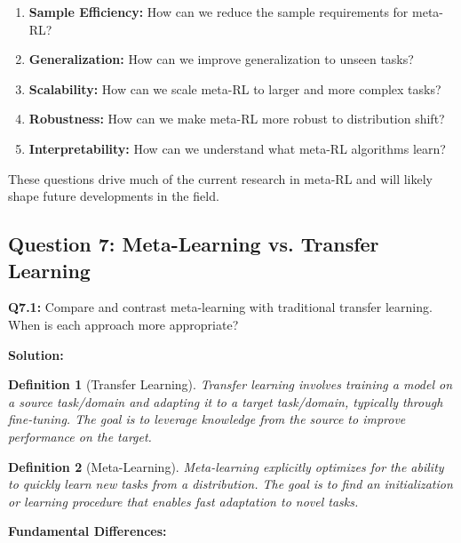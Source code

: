 \documentclass[12pt]{article}
\newcommand{\ieee}[1]{\textcolor{IEEEBlue}{\textbf{#1}}}
\newtheorem{definition}{Definition}
\begin{document}
{{			\begin{enumerate}
				\item \textbf{Sample Efficiency:} How can we reduce the sample requirements for meta-RL?
				\item \textbf{Generalization:} How can we improve generalization to unseen tasks?
				\item \textbf{Scalability:} How can we scale meta-RL to larger and more complex tasks?
				\item \textbf{Robustness:} How can we make meta-RL more robust to distribution shift?
				\item \textbf{Interpretability:} How can we understand what meta-RL algorithms learn?
			\end{enumerate}
			
			These questions drive much of the current research in meta-RL and will likely shape future developments in the field.
			
			\subsection{Question 7: Meta-Learning vs. Transfer Learning}
			
			\textbf{Q7.1:} Compare and contrast meta-learning with traditional transfer learning. When is each approach more appropriate?
			
			\textbf{Solution:}
			
			\begin{definition}[Transfer Learning]
			Transfer learning involves training a model on a source task/domain and adapting it to a target task/domain, typically through fine-tuning. The goal is to leverage knowledge from the source to improve performance on the target.
			\end{definition}
			
			\begin{definition}[Meta-Learning]
			Meta-learning explicitly optimizes for the ability to quickly learn new tasks from a distribution. The goal is to find an initialization or learning procedure that enables fast adaptation to novel tasks.
			\end{definition}
			
			\ieee{Fundamental Differences:}
			
}}
\end{document}
